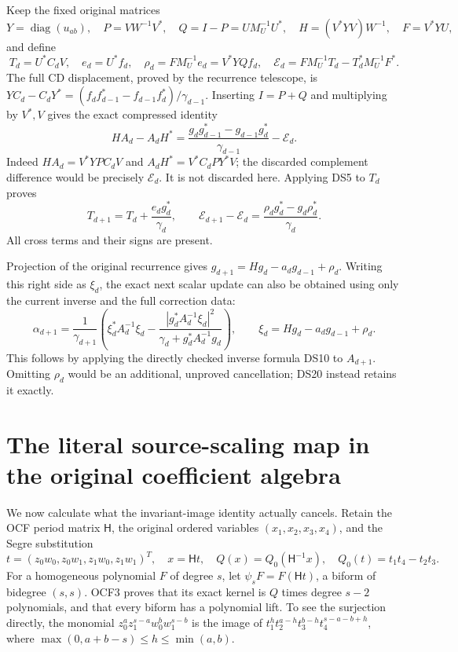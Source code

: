 \documentclass[11pt]{article}
\begin{document}
Keep the fixed original matrices
\[
Y=\operatorname{diag}(u_{ab}),\quad
P=VW^{-1}V^*,\quad Q=I-P=UM_U^{-1}U^*,\quad
H=(V^*YV)W^{-1},\quad F=V^*YU,
\]
and define
\[
T_d=U^*C_dV,\quad e_d=U^*f_d,\quad
\rho_d=FM_U^{-1}e_d=V^*YQf_d,
\quad \mathcal E_d=FM_U^{-1}T_d-T_d^*M_U^{-1}F^*.
\]
The full CD displacement, proved by the recurrence telescope, is
\(YC_d-C_dY^*=(f_df_{d-1}^*-f_{d-1}f_d^*)/\gamma_{d-1}\).
Inserting \(I=P+Q\) and multiplying by \(V^*,V\) gives the exact
compressed identity
\begin{equation}\label{dsroot:eq:correctedCD}
HA_d-A_dH^*
=\frac{g_dg_{d-1}^*-g_{d-1}g_d^*}{\gamma_{d-1}}
-\mathcal E_d.
\tag{DS18}
\end{equation}
Indeed \(HA_d=V^*YPC_dV\) and
\(A_dH^*=V^*C_dPY^*V\); the discarded complement difference would
be precisely \(\mathcal E_d\). It is not discarded here.
Applying DS5 to \(T_d\) proves
\begin{equation}\label{dsroot:eq:correctionstep}
\boxed{T_{d+1}=T_d+\frac{e_dg_d^*}{\gamma_d},\qquad
\mathcal E_{d+1}-\mathcal E_d
=\frac{\rho_dg_d^*-g_d\rho_d^*}{\gamma_d}.}
\tag{DS19}
\end{equation}
All cross terms and their signs are present.

Projection of the original recurrence gives
\(g_{d+1}=Hg_d-a_dg_{d-1}+\rho_d\).
Writing this right side as \(\xi_d\), the exact next scalar update can
also be obtained using only the current inverse and the full correction
data:
\begin{equation}\label{dsroot:eq:nextalpha}
\alpha_{d+1}=\frac1{\gamma_{d+1}}
\left(\xi_d^*A_d^{-1}\xi_d
-\frac{|g_d^*A_d^{-1}\xi_d|^2}
{\gamma_d+g_d^*A_d^{-1}g_d}\right),
\qquad\xi_d=Hg_d-a_dg_{d-1}+\rho_d.
\tag{DS20}
\end{equation}
This follows by applying the directly checked inverse formula DS10
to \(A_{d+1}\). Omitting \(\rho_d\) would be an additional,
unproved cancellation; DS20 instead retains it exactly.

\section{The literal source-scaling map in the original coefficient algebra}

We now calculate what the invariant-image identity actually cancels.
Retain the OCF period matrix \(\mathsf H\), the original ordered
variables \((x_1,x_2,x_3,x_4)\), and the Segre substitution
\[
t=(z_0w_0,z_0w_1,z_1w_0,z_1w_1)^T,\quad x=\mathsf Ht,
\quad Q(x)=Q_0(\mathsf H^{-1}x),\quad
Q_0(t)=t_1t_4-t_2t_3.
\]
For a homogeneous polynomial \(F\) of degree \(s\), let
\(\psi_sF=F(\mathsf Ht)\), a biform of bidegree \((s,s)\).
OCF3 proves that its exact kernel is \(Q\) times degree \(s-2\)
polynomials, and that every biform has a polynomial lift. To see the
surjection directly, the monomial
\(z_0^a z_1^{s-a}w_0^b w_1^{s-b}\) is the image of
\(t_1^h t_2^{a-h}t_3^{b-h}t_4^{s-a-b+h}\), where
\(\max(0,a+b-s)\leq h\leq\min(a,b)\).
\end{document}

